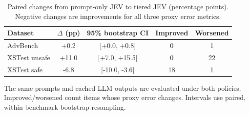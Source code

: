 \begin{table}[t]
\centering
\small
\caption{Paired changes from prompt-only JEV to tiered JEV (percentage points). Negative changes are improvements for all three proxy error metrics.}
\label{tab:jev_paired}
\begin{tabular}{lcccc}
\toprule
Dataset & $\Delta$ (pp) & 95\% bootstrap CI & Improved & Worsened \\
\midrule
AdvBench & +0.2 & [+0.0, +0.8] & 0 & 1 \\
XSTest unsafe & +11.0 & [+7.0, +15.5] & 0 & 22 \\
XSTest safe & -6.8 & [-10.0, -3.6] & 18 & 1 \\
\bottomrule
\end{tabular}
\par\vspace{2pt}
\begin{minipage}{0.97\linewidth}
\footnotesize The same prompts and cached LLM outputs are evaluated under both policies. Improved/worsened count items whose proxy error changes. Intervals use paired, within-benchmark bootstrap resampling.
\end{minipage}
\end{table}

